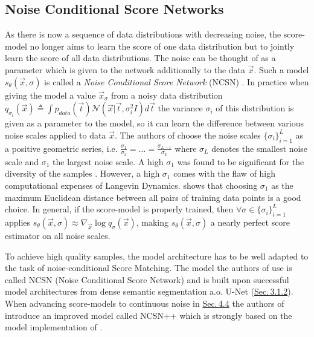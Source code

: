 \subsection{Noise Conditional Score Networks} \label{sec:4.3.1}
As there is now a sequence of data distributions with decreasing noise, the score-model no longer aims to learn the score of one data distribution but to jointly learn the score of all data distributions. The noise can be thought of as a parameter which is given to the network additionally to the data $\vec{x}$. Such a model $s_\theta(\vec{x}, \sigma)$ is called a \textit{Noise Conditional Score Network} (NCSN) \cite{score_1}. In practice when giving the model a value $\vec{x}_\sigma$ from a noisy data distribution $q_{\sigma_i}(\vec{x})\triangleq\int p_{data}(\vec{t})\mathcal{N}(\vec{x}|\vec{t},\sigma_i^2I)d\vec{t}$ the variance $\sigma_i$ of this distribution is given as a parameter to the model, so it can learn the difference between various noise scales applied to data $\vec{x}$. The authors of \cite{score_1} choose the noise scales $\{\sigma_i\}_{i=1}^L$ as a positive geometric series, i.e. $\frac{\sigma_1}{\sigma_2}=\dots=\frac{\sigma_{L-1}}{\sigma_L}$ where $\sigma_L$ denotes the smallest noise scale and $\sigma_1$ the largest noise scale. A high $\sigma_1$ was found to be significant for the diversity of the samples \cite{score_2}. However, a high $\sigma_1$ comes with the flaw of high computational expenses of Langevin Dynamics. \cite{score_2} shows that choosing $\sigma_1$ as the maximum Euclidean distance between all pairs of training data points is a good choice. In general, if the score-model is properly trained, then $\forall\sigma\in\{\sigma_i\}_{i=1}^L$ applies $s_\theta(\vec{x}, \sigma)\approx\nabla_{\vec{x}}\log q_\sigma(\vec{x})$, making $s_\theta(\vec{x},\sigma)$ a nearly perfect score estimator on all noise scales. 

To achieve high quality samples, the model architecture has to be well adapted to the task of noise-conditional Score Matching. The model the authors of \cite{score_1} use is called NCSN (Noise Conditional Score Network) and is built upon successful model architectures from dense semantic segmentation a.o. U-Net (\hyperref[sec:3.1.2]{Sec.\,3.1.2}). When advancing score-models to continuous noise in \hyperref[sec:4.4]{Sec.\,4.4} the authors of \cite{score_3} introduce an improved model called NCSN++ which is strongly based on the model implementation of \cite{ho2020denoising}.

